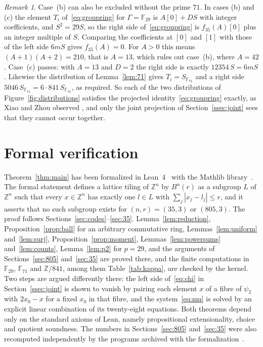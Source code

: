\documentclass{amsart}
\theoremstyle{definition}
\theoremstyle{remark}
\newtheorem{remark}[theorem]{Remark}
\numberwithin{equation}{section}
\newcommand{\Z}{\mathbb{Z}}
\newcommand{\F}{\mathbb{F}}
\newcommand{\gp}[1]{[#1]}
\begin{document}
\begin{remark}\label{rem:xz}
Case~(b) can also be excluded without the prime $71$. In cases (b) and (c) the element $T_i$ of~\eqref{eq:groupring} for $\Gamma=\F_{29}$ is $A\gp0+DS$ with integer coefficients, and $S^2=29S$, so the right side of~\eqref{eq:groupring} is $f_{35}(A)\gp0$ plus an integer multiple of $S$. Comparing the coefficients at $\gp0$ and $\gp1$ with those of the left side $6mS$ gives $f_{35}(A)=0$. For $A>0$ this means $(A+1)(A+2)=210$, that is $A=13$, which rules out case~(b), where $A=42$. Case~(c) passes: with $A=13$ and $D=2$ the right side is exactly $12354\,S=6mS$. Likewise the distribution of Lemma~\ref{lem:71} gives $T_i=S_{\F_{71}}$ and a right side $5046\,S_{\F_{71}}=6\cdot841\,S_{\F_{71}}$, as required. So each of the two distributions of Figure~\ref{fig:distributions} satisfies the projected identity~\eqref{eq:groupring} exactly, as Xiao and Zhou observed \cite[Example~5.14]{XZ}, and only the joint projection of Section~\ref{ssec:joint} sees that they cannot occur together.
\end{remark}

\section{Formal verification}\label{sec:lean}

Theorem~\ref{thm:main} has been formalized in Lean~4~\cite{Lean} with the Mathlib library~\cite{Mathlib}. The formal statement defines a lattice tiling of $\Z^n$ by $B^n(r)$ as a subgroup $L$ of $\Z^n$ such that every $x\in\Z^n$ has exactly one $l\in L$ with $\sum_j|x_j-l_j|\le r$, and it asserts that no such subgroup exists for $(n,r)=(35,3)$ or $(805,3)$. The proof follows Sections~\ref{sec:codes}--\ref{sec:35}. Lemma~\ref{lem:reduction}, Proposition~\ref{prop:ball} for an arbitrary commutative ring, Lemmas~\ref{lem:uniform} and~\ref{lem:surj}, Proposition~\ref{prop:moment}, Lemmas~\ref{lem:powersums} and~\ref{lem:counts}, Lemma~\ref{lem:p2} for $p=29$, and the arguments of Sections~\ref{sec:805} and~\ref{sec:35} are proved there, and the finite computations in $\F_{29}$, $\F_{71}$ and $\Z/841$, among them Table~\ref{tab:kappa}, are checked by the kernel. Two steps are argued differently there: the left side of~\eqref{eq:chi} in Section~\ref{ssec:joint} is shown to vanish by pairing each element $x$ of a fibre of $\psi_2$ with $2x_0-x$ for a fixed $x_0$ in that fibre, and the system~\eqref{eq:mu} is solved by an explicit linear combination of its twenty-eight equations. Both theorems depend only on the standard axioms of Lean, namely propositional extensionality, choice and quotient soundness. The numbers in Sections~\ref{sec:805} and~\ref{sec:35} were also recomputed independently by the programs archived with the formalization~\cite{archive}.
\end{document}
